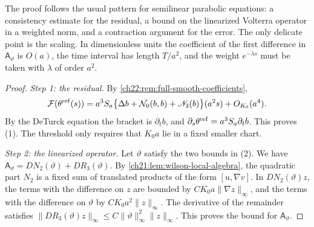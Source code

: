 The proof follows the usual pattern for semilinear parabolic equations: a consistency estimate for the residual, a bound on the linearized Volterra operator in a weighted norm, and a contraction argument for the error. The only delicate point is the scaling. In dimensionless units the coefficient of the first difference in $\mathsf A_\vartheta$ is $O(a)$, the time interval has length $T/a^2$, and the weight $e^{-\lambda s}$ must be taken with $\lambda$ of order $a^2$.

\begin{proof}
\emph{Step 1: the residual.} By \cref{ch22:rem:full-smooth-coefficients},
\[
 \mathcal F(\theta^{\rm ref}(s))=a^3S_a\bigl\{\Delta b+\mathcal N_0(b,b)+\mathscr N_3(b)\bigr\}(a^2s)+O_{K_0}(a^4).
\]
By the DeTurck equation the bracket is $\partial_tb$, and $\partial_s\theta^{\rm ref}=a^3S_a\partial_tb$. This proves (1). The threshold only requires that $K_0a$ lie in a fixed smaller chart.

\emph{Step 2: the linearized operator.} Let $\vartheta$ satisfy the two bounds in (2). We have $\mathsf A_\vartheta=DN_2(\vartheta)+DR_3(\vartheta)$. By \cref{ch21:lem:wilson-local-algebra}, the quadratic part $N_2$ is a fixed sum of translated products of the form $[u,\nabla v]$. In $DN_2(\vartheta)z$, the terms with the difference on $z$ are bounded by $CK_0a\|\nabla z\|_\infty$, and the terms with the difference on $\vartheta$ by $CK_0a^2\|z\|_\infty$. The derivative of the remainder satisfies $\|DR_3(\vartheta)z\|_\infty\le C\|\vartheta\|_\infty^2\|z\|_\infty$. This proves the bound for $\mathsf A_\vartheta$.


\end{proof}
